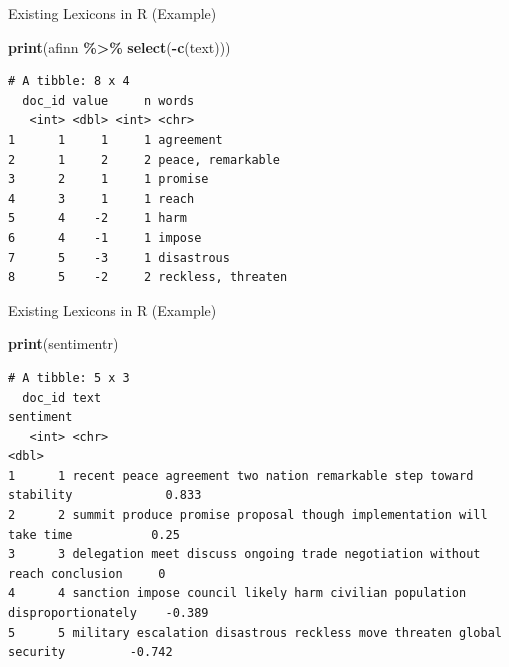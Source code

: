 \documentclass[
  ignorenonframetext,
  aspectratio=169]{beamer}
\newenvironment{Shaded}{\begin{snugshade}}{\end{snugshade}}
\newcommand{\FunctionTok}[1]{\textcolor[rgb]{0.13,0.29,0.53}{\textbf{#1}}}
\newcommand{\NormalTok}[1]{#1}
\newcommand{\SpecialCharTok}[1]{\textcolor[rgb]{0.81,0.36,0.00}{\textbf{#1}}}
\begin{document}
\begin{frame}[fragile]{Existing Lexicons in R (Example)}
\label{existing-lexicons-in-r-example-2}
\scriptsize

\begin{Shaded}
\begin{Highlighting}[]
\FunctionTok{print}\NormalTok{(afinn }\SpecialCharTok{\%\textgreater{}\%} \FunctionTok{select}\NormalTok{(}\SpecialCharTok{{-}}\FunctionTok{c}\NormalTok{(text))) }
\end{Highlighting}
\end{Shaded}

\begin{verbatim}
# A tibble: 8 x 4
  doc_id value     n words             
   <int> <dbl> <int> <chr>             
1      1     1     1 agreement         
2      1     2     2 peace, remarkable 
3      2     1     1 promise           
4      3     1     1 reach             
5      4    -2     1 harm              
6      4    -1     1 impose            
7      5    -3     1 disastrous        
8      5    -2     2 reckless, threaten
\end{verbatim}
\end{frame}

\begin{frame}[fragile]{Existing Lexicons in R (Example)}
\label{existing-lexicons-in-r-example-3}
\scriptsize

\begin{Shaded}
\begin{Highlighting}[]
\FunctionTok{print}\NormalTok{(sentimentr)}
\end{Highlighting}
\end{Shaded}

\begin{verbatim}
# A tibble: 5 x 3
  doc_id text                                                                       sentiment
   <int> <chr>                                                                          <dbl>
1      1 recent peace agreement two nation remarkable step toward stability             0.833
2      2 summit produce promise proposal though implementation will take time           0.25 
3      3 delegation meet discuss ongoing trade negotiation without reach conclusion     0    
4      4 sanction impose council likely harm civilian population disproportionately    -0.389
5      5 military escalation disastrous reckless move threaten global security         -0.742
\end{verbatim}
\end{frame}
\end{document}
